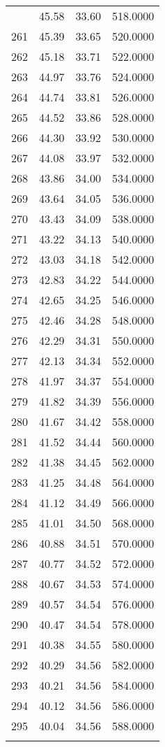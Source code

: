 \documentclass[
  captions=tableheading,
]{scrartcl}
\begin{document}
\begin{longtable} {l|l|l|l}
{260 &	45.58 &	33.60 &	518.0000\\
261 &	45.39 &	33.65 &	520.0000\\
262 &	45.18 &	33.71 &	522.0000\\
263 &	44.97 &	33.76 &	524.0000\\
264 &	44.74 &	33.81 &	526.0000\\
265 &	44.52 &	33.86 &	528.0000\\
266 &	44.30 &	33.92 &	530.0000\\
267 &	44.08 &	33.97 &	532.0000\\
268 &	43.86 &	34.00 &	534.0000\\
269 &	43.64 &	34.05 &	536.0000\\
270 &	43.43 &	34.09 &	538.0000\\
271 &	43.22 &	34.13 &	540.0000\\
272 &	43.03 &	34.18 &	542.0000\\
273 &	42.83 &	34.22 &	544.0000\\
274 &	42.65 &	34.25 &	546.0000\\
275 &	42.46 &	34.28 &	548.0000\\
276 &	42.29 &	34.31 &	550.0000\\
277 &	42.13 &	34.34 &	552.0000\\
278 &	41.97 &	34.37 &	554.0000\\
279 &	41.82 &	34.39 &	556.0000\\
280 &	41.67 &	34.42 &	558.0000\\
281 &	41.52 &	34.44 &	560.0000\\
282 &	41.38 &	34.45 &	562.0000\\
283 &	41.25 &	34.48 &	564.0000\\
284 &	41.12 &	34.49 &	566.0000\\
285 &	41.01 &	34.50 &	568.0000\\
286 &	40.88 &	34.51 &	570.0000\\
287 &	40.77 &	34.52 &	572.0000\\
288 &	40.67 &	34.53 &	574.0000\\
289 &	40.57 &	34.54 &	576.0000\\
290 &	40.47 &	34.54 &	578.0000\\
291 &	40.38 &	34.55 &	580.0000\\
292 &	40.29 &	34.56 &	582.0000\\
293 &	40.21 &	34.56 &	584.0000\\
294 &	40.12 &	34.56 &	586.0000\\
295 &	40.04 &	34.56 &	588.0000\\
}
\end{longtable}
\end{document}
